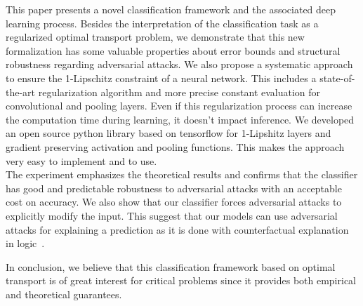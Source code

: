 This paper presents a novel classification framework and the associated deep learning process. Besides the interpretation of the classification task as a regularized optimal transport problem, we demonstrate that this new formalization has some valuable properties about error bounds and structural robustness regarding adversarial attacks. We also propose a systematic approach to ensure the 1-Lipschitz constraint of a neural network. This includes a state-of-the-art regularization algorithm and more precise constant evaluation for convolutional and pooling layers. Even if this regularization process can increase the computation time during learning, it doesn't impact inference. We developed an open source python library based on tensorflow for 1-Lipshitz layers and gradient preserving activation and pooling functions. This makes the approach very easy to implement and to use. \\

The experiment emphasizes the theoretical results and confirms that the classifier has good and predictable robustness to adversarial attacks with an acceptable cost on accuracy. We also show that our classifier forces adversarial attacks to explicitly modify the input. This suggest that our models can use adversarial attacks for explaining a prediction as it is done with counterfactual explanation in logic~\cite{DBLP:journals/corr/abs-1711-00399}.

In conclusion, we believe that this classification framework based on optimal transport is of great interest for critical problems since it provides both empirical and theoretical guarantees. %
